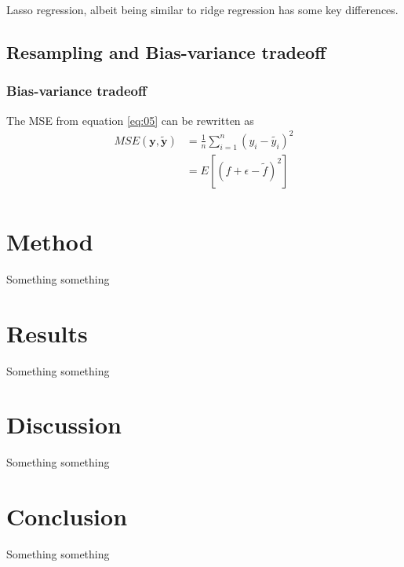 \documentclass[uio,jmp,amsmath,amssymb,reprint]{revtex4-1}
\numberwithin{equation}{section}
\newcommand{\lsb}{\left[}
\newcommand{\rsb}{\right]}
\begin{document}
Lasso regression, albeit being similar to ridge regression has some key differences.





\subsection{Resampling and Bias-variance tradeoff}

\subsubsection{Bias-variance tradeoff}

The MSE from equation \ref{eq:05} can be rewritten as
\begin{align}
     MSE(\bm{y}, \bm{\tilde{y}}) &= \frac{1}{n}\sum_{i=1}^n(y_i - \tilde{y_i})^2\\
     &= E\lsb (f+\epsilon-\tilde{f})^2\rsb\\
\end{align}

\section{Method}\label{sec:Method}

Something something


\section{Results}\label{sec:Results}

Something something

\section{Discussion}\label{sec:Discussion}

Something something

\section{Conclusion}\label{sec:Conclusion}

Something something





\onecolumngrid



\end{document}
